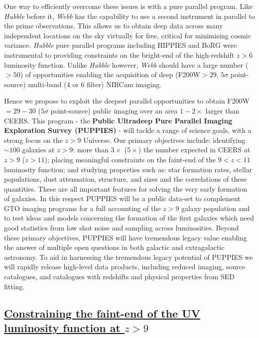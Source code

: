 \documentclass[12pt]{article}
\begin{document}
One way to efficiently overcome these issues is with a pure parallel program. Like \emph{Hubble} before it, \emph{Webb} has the capability to use a second instrument in parallel to the prime observations. This allows us to obtain deep data across many independent locations on the sky virtually for free, critical for minimising cosmic variance. \emph{Hubble} pure parallel programs including HIPPIES \citep{Yan2011} and BoRG \citep{Trenti2011} were instrumental to providing constraints on the bright-end of the high-redshift $z>6$ luminosity function. Unlike \emph{Hubble} however, \emph{Webb} should have a large number ($>50$) of opportunities enabling the acquisition of deep (F200W$>29$, $5\sigma$ point-source) multi-band (4 or 6 filter) NIRCam imaging. 

\vspace{2mm}
\noindent
Hence we propose to exploit the deepest parallel opportunities to obtain F200W$=29-30$ ($5\sigma$ point-source) public imaging over an area $1-2\times$ larger than CEERS. This program - the \textbf{Public Ultradeep Pure Parallel Imaging Exploration Survey (PUPPIES)} - will tackle a range of science goals, with a strong focus on the $z>9$ Universe. Our primary objectives include: identifying $\sim 100$ galaxies at $z>9$: more than $3\times$ ($5\times$) the number expected in CEERS at $z>9$ ($z>11$); placing meaningful constraints on the faint-end of the $9<z<11$ luminosity function; and studying properties such as: star formation rates, stellar populations, dust attenuation, structure, and sizes and the correlations of these quantities. These are all important features for solving the very early formation of galaxies. In this respect PUPPIES will be a public data-set to complement GTO imaging programs for a full accounting of the $z > 9$ galaxy population and to test ideas and models concerning the formation of the first galaxies which need good statistics from low shot noise and sampling across luminosities. Beyond these primary objectives, PUPPIES will have tremendous legacy value enabling the answer of multiple open questions in both galactic and extragalactic astronomy. To aid in harnessing the tremendous legacy potential of PUPPIES we will rapidly release high-level data products, including reduced imaging, source catalogues, and catalogues with redshifts and physical properties from SED fitting.  


\subsection*{\bf \underline{Constraining the faint-end of the UV luminosity function at $z > 9$}}\label{sec:UVLF}
\end{document}
